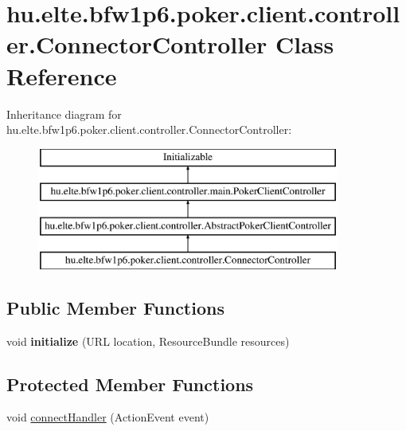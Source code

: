 \hypertarget{classhu_1_1elte_1_1bfw1p6_1_1poker_1_1client_1_1controller_1_1_connector_controller}{}\section{hu.\+elte.\+bfw1p6.\+poker.\+client.\+controller.\+Connector\+Controller Class Reference}
\label{classhu_1_1elte_1_1bfw1p6_1_1poker_1_1client_1_1controller_1_1_connector_controller}
Inheritance diagram for hu.\+elte.\+bfw1p6.\+poker.\+client.\+controller.\+Connector\+Controller\+:\begin{figure}[H]
\begin{center}
\leavevmode
\includegraphics[height=4.000000cm]{classhu_1_1elte_1_1bfw1p6_1_1poker_1_1client_1_1controller_1_1_connector_controller}
\end{center}
\end{figure}
\subsection*{Public Member Functions}
\begin{DoxyCompactItemize}
\item 
\hypertarget{classhu_1_1elte_1_1bfw1p6_1_1poker_1_1client_1_1controller_1_1_connector_controller_a575c18822a18155b121d4c8e348733d5}{}void {\bfseries initialize} (U\+R\+L location, Resource\+Bundle resources)\label{classhu_1_1elte_1_1bfw1p6_1_1poker_1_1client_1_1controller_1_1_connector_controller_a575c18822a18155b121d4c8e348733d5}

\end{DoxyCompactItemize}
\subsection*{Protected Member Functions}
\begin{DoxyCompactItemize}
\item 
void \hyperlink{classhu_1_1elte_1_1bfw1p6_1_1poker_1_1client_1_1controller_1_1_connector_controller_adfd36fc07dd1367cdcf61d6ee3ff6d3f}{connect\+Handler} (Action\+Event event)
\end{DoxyCompactItemize}
